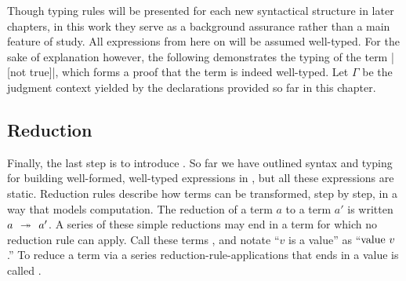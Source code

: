 Though typing rules will be presented for each new syntactical structure in later chapters, in this work they serve as a background assurance rather than a main feature of study.
All expressions from here on will be assumed well-typed.
For the sake of explanation however, the following demonstrates the typing of the term \code|[not true]|, which forms a proof that the term is indeed well-typed.
Let $Γ$ be the judgment context yielded by the declarations provided so far in this chapter.
%
%

\newpage
\subsection{Reduction}
\label{sec:LangA-reduction}

Finally, the last step is to introduce .
So far we have outlined syntax and typing for building well-formed, well-typed expressions in \LangA, but all these expressions are static.
Reduction rules describe how terms can be transformed, step by step, in a way that models computation.
The reduction of a term $a$ to a term $a'$ is written $a \hspace{0.4em}\twoheadrightarrow\hspace{0.4em} a'$.
A series of these simple reductions may end in a term for which no reduction rule can apply. Call these terms , and notate ``$v$ is a value'' as ``$\mathrm{value}~v$.''
To reduce a term via a series reduction-rule-applications that ends in a value is called .

